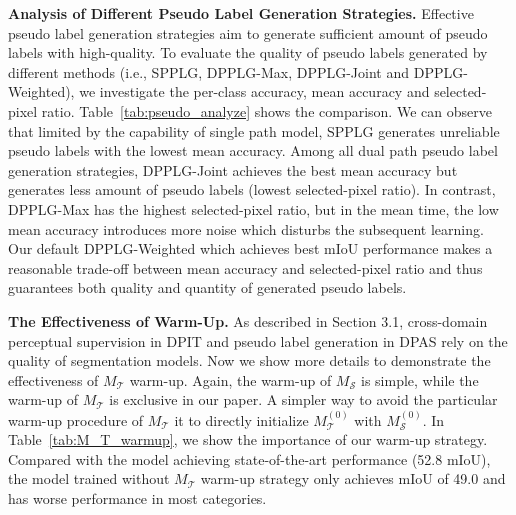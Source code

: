 \documentclass[10pt,twocolumn,letterpaper]{article}
\begin{document}
{\noindent \textbf{Analysis of Different Pseudo Label Generation Strategies.}}\hspace{3pt}
Effective pseudo label generation strategies aim to generate sufficient amount of pseudo labels with high-quality. To evaluate the quality of pseudo labels generated by different methods (i.e., SPPLG, DPPLG-Max, DPPLG-Joint and DPPLG-Weighted), we investigate the per-class accuracy, mean accuracy and selected-pixel ratio. Table~\ref{tab:pseudo_analyze} shows the comparison. We can observe that limited by the capability of single path model, SPPLG generates unreliable pseudo labels with the lowest mean accuracy. Among all dual path pseudo label generation strategies, DPPLG-Joint achieves the best mean accuracy but generates less amount of pseudo labels (lowest selected-pixel ratio). In contrast, DPPLG-Max has the highest selected-pixel ratio, but in the mean time, the low mean accuracy introduces more noise which disturbs the subsequent learning. Our default DPPLG-Weighted which achieves best mIoU performance makes a reasonable trade-off between mean accuracy and selected-pixel ratio and thus guarantees both quality and quantity of generated pseudo labels.


{\noindent \textbf{The Effectiveness of  Warm-Up.}}\hspace{3pt}
As described in Section 3.1, cross-domain perceptual supervision in DPIT and pseudo label generation in DPAS rely on the quality of segmentation models. Now we show more details to demonstrate the effectiveness of $M_{\mathcal{T}}$ warm-up. Again, the warm-up of ${M_{\mathcal{S}}}$ is simple, while the warm-up of ${M_{\mathcal{T}}}$ is exclusive in our paper. A simpler way to avoid the particular warm-up procedure of ${M_{\mathcal{T}}}$ it to directly initialize $M_{\mathcal{T}}^{(0)}$ with $M_{\mathcal{S}}^{(0)}$. In Table~\ref{tab:M_T_warmup}, we show the importance of our warm-up strategy. Compared with the model achieving state-of-the-art performance (52.8 mIoU), the model trained without ${M_{\mathcal{T}}}$ warm-up strategy only achieves mIoU of 49.0 and has worse performance in most categories.
\end{document}

